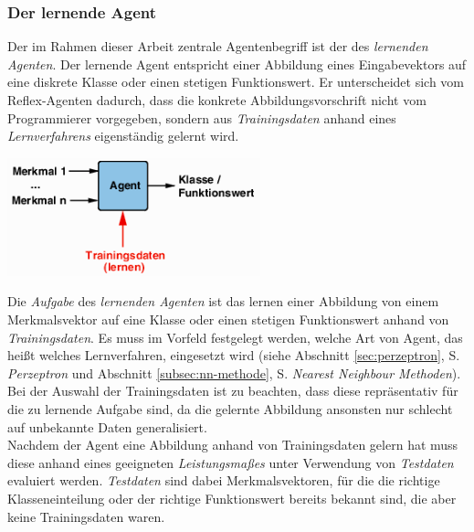 \documentclass[fontsize=11pt]{scrartcl}
\newenvironment{Figure}
  {\par\medskip\noindent\minipage{\linewidth}}
  {\endminipage\par\medskip}
\newcommand*{\quelle}{%
  \footnotesize Quelle: 
}
\begin{document}
            \subsubsection{Der lernende Agent}
            \label{subsec:lernenderagent}
                Der im Rahmen dieser Arbeit zentrale Agentenbegriff ist der des \emph{lernenden Agenten}. Der lernende Agent entspricht einer Abbildung eines Eingabevektors auf eine diskrete Klasse oder einen stetigen Funktionswert. Er unterscheidet sich vom Reflex-Agenten dadurch, dass die konkrete Abbildungsvorschrift nicht vom Programmierer vorgegeben, sondern aus \emph{Trainingsdaten} anhand eines \emph{Lernverfahrens} eigenständig gelernt wird\cite{ertel2016}.
                \begin{Figure}
                   \centering
                   \includegraphics[scale=1]{lernenderagent.png}
                   \raggedleft\footnotesize\cite[S.194, Abb. 8.4(rechts)]{ertel2016}
                \end{Figure}
                Die \emph{Aufgabe} des \emph{lernenden Agenten} ist das lernen einer Abbildung von einem Merkmalsvektor auf eine Klasse oder einen stetigen Funktionswert anhand von \emph{Trainingsdaten}. Es muss im Vorfeld festgelegt werden, welche Art von Agent, das heißt welches Lernverfahren, eingesetzt wird (siehe Abschnitt \ref{sec:perzeptron}, S. \pageref{sec:perzeptron} \emph{Perzeptron} und Abschnitt \ref{subsec:nn-methode}, S. \pageref{subsec:nn-methode} \emph{Nearest Neighbour Methoden}).
                Bei der Auswahl der Trainingsdaten ist zu beachten, dass diese repräsentativ für die zu lernende Aufgabe sind, da die gelernte Abbildung ansonsten nur schlecht auf unbekannte Daten generalisiert.\\
                Nachdem der Agent eine Abbildung anhand von Trainingsdaten gelern hat muss diese anhand eines geeigneten \emph{Leistungsmaßes} unter Verwendung von \emph{Testdaten} evaluiert werden. \emph{Testdaten} sind dabei Merkmalsvektoren, für die  die richtige Klasseneinteilung oder der richtige Funktionswert bereits bekannt sind, die aber keine Trainingsdaten waren\cite{ertel2016}.
\end{document}
